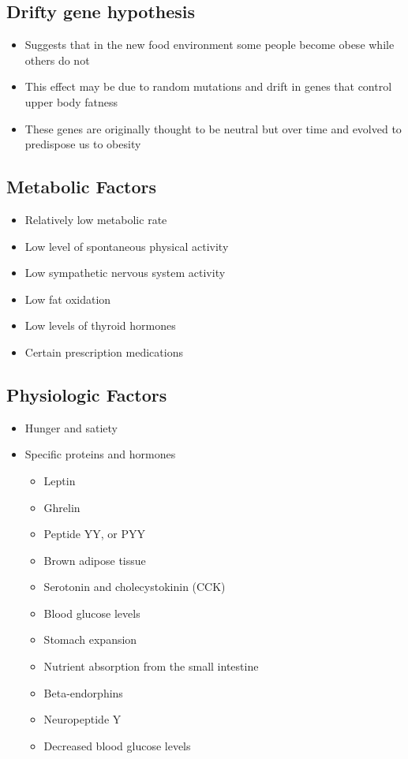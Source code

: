 \documentclass[title={Chapter 10: Achieving and Maintaining a Healthful Body Weight}]{fdsn201notes}
\begin{document}
\subsection{Drifty gene hypothesis}\label{subsec:drifty-gene-hypothesis}
\begin{itemize}
	\item Suggests that in the new food environment some people become obese while others do not
	\item This effect may be due to random mutations and drift in genes that control upper body fatness
	\item These genes are originally thought to be neutral but over time and evolved to predispose us to obesity
\end{itemize}

\subsection{Metabolic Factors}\label{subsec:metabolic-factors}
\begin{itemize}
	\item Relatively low metabolic rate
	\item Low level of spontaneous physical activity
	\item Low sympathetic nervous system activity
	\item Low fat oxidation
	\item Low levels of thyroid hormones
	\item Certain prescription medications
\end{itemize}

\subsection{Physiologic Factors}\label{subsec:physiologic-factors}
\begin{itemize}
	\item Hunger and satiety
	\item Specific proteins and hormones
	\begin{itemize}
		\item Leptin
		\item Ghrelin
		\item Peptide YY, or PYY
		\item Brown adipose tissue
		\item Serotonin and cholecystokinin (CCK)
		\item Blood glucose levels
		\item Stomach expansion
		\item Nutrient absorption from the small intestine
		\item Beta-endorphins
		\item Neuropeptide Y
		\item Decreased blood glucose levels
	\end{itemize}
\end{itemize}
\end{document}
